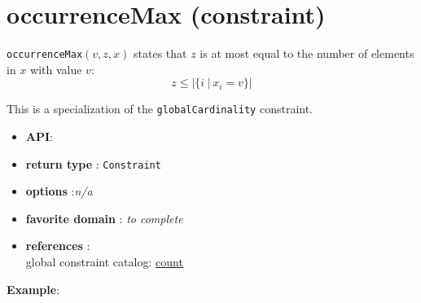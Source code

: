 \label{occurrencemax}
\hypertarget{occurrencemax}{}

\section{occurrenceMax (constraint)}\label{occurrencemax:occurrencemaxconstraint}\hypertarget{occurrencemax:occurrencemaxconstraint}{}
\begin{notedef}
  \texttt{occurrenceMax}$(v,z,x)$ states that $z$ is at most equal to the number of elements in $x$ with value $v$:
$$z\le|\{i\ |\ x_i=v\}|$$   
\end{notedef}
  This is a specialization of the \texttt{globalCardinality} constraint.

\begin{itemize}
	\item \textbf{API}: 
	\item \textbf{return type} : \texttt{Constraint}
	\item \textbf{options} :\emph{n/a}
	\item \textbf{favorite domain} : \emph{to complete}
	\item \textbf{references} :\\
      global constraint catalog: \href{http://www.emn.fr/x-info/sdemasse/gccat/Ccount.html}{count}
\end{itemize}

\textbf{Example}:
